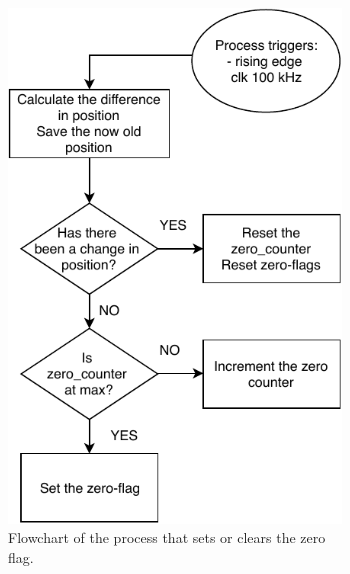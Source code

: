 \documentclass[../../main.tex]{subfiles}
\begin{document}
    

\begin{figure}[h]
\begin{subfigure}{0.48\textwidth}
    \includegraphics[width = 0.97\textwidth]{Sections/System_Implementation/Images/FPGAProcessSpeedZeroFlowchart.pdf}
    \caption{Flowchart of the process that sets or clears the zero flag.}
    \label{subfig:FPGAProcessSpeedZeroFlowchart}
\end{subfigure}\quad
\begin{subfigure}{0.48\textwidth}

\end{subfigure}
\end{figure}
\end{document}
